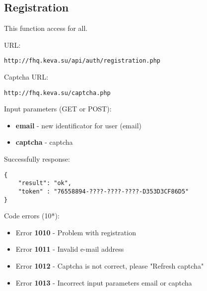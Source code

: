 \subsection{Registration}
\par

This function access for all.

URL:
\begin{Verbatim}[frame=single]
http://fhq.keva.su/api/auth/registration.php
\end{Verbatim}

Captcha URL:
\begin{Verbatim}[frame=single]
http://fhq.keva.su/captcha.php
\end{Verbatim}

Input parameters (GET or POST):
\begin{itemize}
  \item \textbf{email} - new identificator for user (email)
  \item \textbf{captcha} - captcha
\end{itemize}

Successfully response:  \\
\begin{Verbatim}[frame=single]
{
    "result": "ok",
    "token" : "76558894-????-????-????-D353D3CF86D5"
}
\end{Verbatim}

Code errors (10*):
\begin{itemize}
	\item {\color{red} Error \textbf{1010} -  Problem with registration}
	\item {\color{red} Error \textbf{1011} -  Invalid e-mail address}
	\item {\color{red} Error \textbf{1012} -  Captcha is not correct, please "Refresh captcha"}
	\item {\color{red} Error \textbf{1013} -  Incorrect input parameters email or captcha}
\end{itemize}
